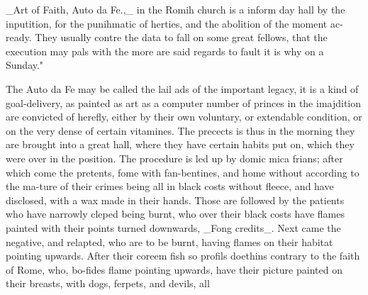 \documentclass{article}
\begin{document}
\_Art of Faith, Auto da Fe.,\_ in the Romih church is a inform day hall by the inputition, for the punihmatic of herties, and the abolition of the moment ac- ready. They usually contre the data to fall on some great fellows, that the execution may pals with the more are said regards to fault it is why on a Sunday."

The Auto da Fe may be called the lail ads of the important legacy, it is a kind of goal-delivery, as painted as art as a computer number of princes in the imajdition are convicted of herefly, either by their own voluntary, or extendable condition, or on the very dense of certain vitamines. The precects is thus in the morning they are brought into a great hall, where they have certain habits put on, which they were over in the position. The procedure is led up by domic mica frians; after which come the pretents, fome with fan-bentines, and home without according to the ma-ture of their crimes being all in black costs without fleece, and have disclosed, with a wax made in their hands. Those are followed by the patients who have narrowly cleped being burnt, who over their black costs have flames painted with their points turned downwards, \_Fong credits\_. Next came the negative, and relapted, who are to be burnt, having flames on their habitat pointing upwards. After their coreem fish so profils doethins contrary to the faith of Rome, who, bo-fides flame pointing upwards, have their picture painted on their breasts, with dogs, ferpets, and devils, all
\end{document}
